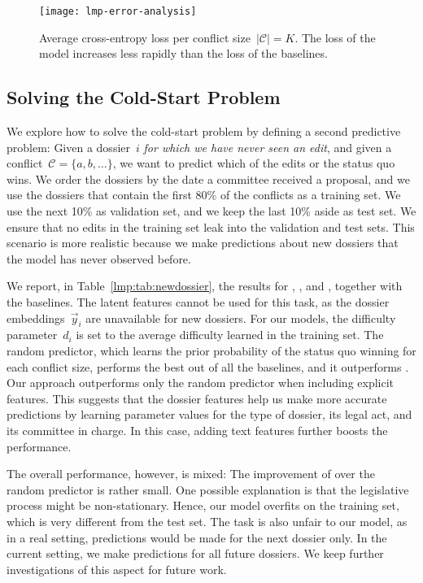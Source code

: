 \begin{figure}
  \centering
  \texttt{[image: lmp-error-analysis]}
	\caption{%
		Average cross-entropy loss per conflict size~$\vert \mathcal{C} \vert = K$.
		The loss of the  model increases less rapidly than the loss of the baselines.
	}
	\label{lmp:fig:error-analysis}
\end{figure}

\subsection{Solving the Cold-Start Problem}
\label{lmp:sec:cold-start}

We explore how to solve the cold-start problem by defining a second predictive problem:
Given a dossier~$i$ \textit{for which we have never seen an edit}, and given a conflict~$\mathcal{C} = \{a, b, \ldots \}$, we want to predict which of the edits or the status quo wins.
We order the dossiers by the date a committee received a proposal, and we use the dossiers that contain the first 80\% of the conflicts as a training set.
We use the next 10\% as validation set, and we keep the last 10\% aside as test set.
We ensure that no edits in the training set leak into the validation and test sets.
This scenario is more realistic because we make predictions about new dossiers that the model has never observed before.

We report, in Table~\ref{lmp:tab:newdossier}, the results for , , and , together with the baselines.
The latent features cannot be used for this task, as the dossier embeddings~$\vec{y}_i$ are unavailable for new dossiers.
For our models, the difficulty parameter~$d_i$ is set to the average difficulty learned in the training set.
The random predictor, which learns the prior probability of the status quo winning for each conflict size, performs the best out of all the baselines, and it outperforms .
Our approach outperforms only the random predictor when including explicit features.
This suggests that the dossier features help us make more accurate predictions by learning parameter values for the type of dossier, its legal act, and its committee in charge.
In this case, adding text features further boosts the performance.

The overall performance, however, is mixed:
The improvement of  over the random predictor is rather small.
One possible explanation is that the legislative process might be non-stationary.
Hence, our model overfits on the training set, which is very different from the test set.
The task is also unfair to our model, as in a real setting, predictions would be made for the next dossier only.
In the current setting, we make predictions for all future dossiers.
We keep further investigations of this aspect for future work.

